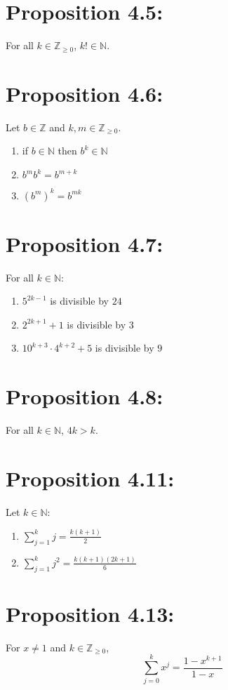 \section*{Proposition 4.5:}
For all $k \in \mathbb{Z}_{\geq 0}$, $k! \in \mathbb{N}$.

\section*{Proposition 4.6:}
Let $b \in \mathbb{Z}$ and $k,m \in \mathbb{Z}_{\geq 0}$.
\begin{enumerate}
    \item if $b \in \mathbb{N}$ then $b^k \in \mathbb{N}$
    \item $b^mb^k = b^{m+k}$
    \item $(b^m)^k = b^{mk}$
\end{enumerate}

\section*{Proposition 4.7:}
For all $k \in \mathbb{N}$:
\begin{enumerate}
    \item $5^{2k-1}$ is divisible by $24$
    \item $2^{2k+1} + 1$ is divisible by $3$
    \item $10^{k+3} \cdot 4^{k+2} + 5$ is divisible by $9$
\end{enumerate}

\section*{Proposition 4.8:}
For all $k \in \mathbb{N}$, $4k > k$.

\section*{Proposition 4.11:}
Let $k \in \mathbb{N}$:
\begin{enumerate}
    \item $\sum_{j=1}^k j = \frac{k(k+1)}{2}$
    \item $\sum_{j=1}^k j^2 = \frac{k(k+1)(2k+1)}{6}$
\end{enumerate}

\section*{Proposition 4.13:}
For $x \neq 1$ and $k \in \mathbb{Z}_{\geq 0}$,
\[ \sum_{j=0}^k x^j = \frac{1 - x^{k+1}}{1 - x} \]

